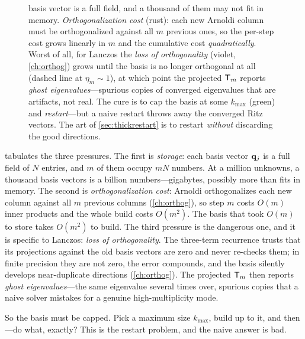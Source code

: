 \begin{figure}[t]
{basis vector is a full field, and a thousand of them may not fit in memory. \emph{Orthogonalization
cost} (rust): each new Arnoldi column must be orthogonalized against all $m$ previous ones, so
the per-step cost grows linearly in $m$ and the cumulative cost \emph{quadratically}. Worst of
all, for Lanczos the \emph{loss of orthogonality} (violet, \cref{ch:orthog}) grows until the
basis is no longer orthogonal at all (dashed line at $\eta_m \sim 1$), at which point the
projected $\mathsf{T}_m$ reports \emph{ghost eigenvalues}---spurious copies of converged
eigenvalues that are artifacts, not real. The cure is to cap the basis at some $k_{\max}$
(green) and \emph{restart}---but a naive restart throws away the converged Ritz vectors. The
art of \cref{sec:thickrestart} is to restart \emph{without} discarding the good directions.}
\label{fig:restartproblem}
\end{figure}

 tabulates the three pressures. The first is \emph{storage}: each
basis vector $\mathbf{q}_j$ is a full field of $N$ entries, and $m$ of them occupy $mN$ numbers. At a
million unknowns, a thousand basis vectors is a billion numbers---gigabytes, possibly more than
fits in memory. The second is \emph{orthogonalization cost}: Arnoldi orthogonalizes each new
column against all $m$ previous columns (\cref{ch:orthog}), so step $m$ costs $O(m)$ inner
products and the whole build costs $O(m^2)$. The basis that took $O(m)$ to store takes $O(m^2)$
to build. The third pressure is the dangerous one, and it is specific to Lanczos: \emph{loss of
orthogonality}. The three-term recurrence trusts that its projections against the old basis
vectors are zero and never re-checks them; in finite precision they are not zero, the error
compounds, and the basis silently develops near-duplicate directions
(\cref{ch:orthog}). The projected $\mathsf{T}_m$ then reports \emph{ghost eigenvalues}---the same
eigenvalue several times over, spurious copies that a naive solver mistakes for a genuine
high-multiplicity mode.

So the basis must be capped. Pick a maximum size $k_{\max}$, build up to it, and then---do what,
exactly? This is the restart problem, and the naive answer is bad.

